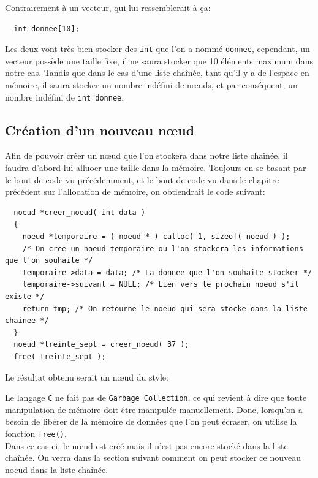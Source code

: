 \documentclass[11pt]{article}
\begin{document}
Contrairement à un vecteur, qui lui ressemblerait à ça:
\begin{lstlisting}
  int donnee[10];
\end{lstlisting}

Les deux vont très bien stocker des \texttt{int} que l'on a nommé \texttt{donnee}, cependant, un vecteur possède une taille fixe, il ne saura stocker que 10 éléments maximum dans notre cas. Tandis que dans le cas d'une liste chaînée, tant qu'il y a de l'espace en mémoire, il saura stocker un nombre indéfini de n\oe{}uds, et par conséquent, un nombre indéfini de \texttt{int donnee}.

\subsection{Création d'un nouveau n\oe{}ud}
Afin de pouvoir créer un n\oe{}ud que l'on stockera dans notre liste chaînée, il faudra d'abord lui alluoer une taille dans la mémoire. Toujours en se basant par le bout de code vu précédemment, et le bout de code vu dans le chapitre précédent sur l'allocation de mémoire, on obtiendrait le code suivant:
\begin{lstlisting}
  noeud *creer_noeud( int data )
  {
    noeud *temporaire = ( noeud * ) calloc( 1, sizeof( noeud ) );
    /* On cree un noeud temporaire ou l'on stockera les informations que l'on souhaite */
    temporaire->data = data; /* La donnee que l'on souhaite stocker */
    temporaire->suivant = NULL; /* Lien vers le prochain noeud s'il existe */
    return tmp; /* On retourne le noeud qui sera stocke dans la liste chainee */
  }
  noeud *treinte_sept = creer_noeud( 37 );
  free( treinte_sept );
\end{lstlisting}
Le résultat obtenu serait un n\oe{}ud du style:

Le langage \texttt{C} ne fait pas de \texttt{Garbage Collection}, ce qui revient à dire que toute manipulation de mémoire doit être manipulée manuellement. Donc, lorsqu'on a besoin de libérer de la mémoire de données que l'on peut écraser, on utilise la fonction \texttt{free()}.\\
Dans ce cas-ci, le n\oe{}ud est créé mais il n'est pas encore stocké dans la liste chaînée.
On verra dans la section suivant comment on peut stocker ce nouveau noeud dans la liste chaînée.
\end{document}
